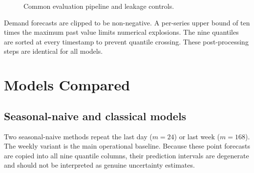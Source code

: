 \documentclass[11pt,a4paper]{article}
\begin{document}
\begin{figure}[htbp]
\centering
{}
\caption{Common evaluation pipeline and leakage controls.}
\label{fig:pipeline}
\end{figure}

Demand forecasts are clipped to be non-negative. A per-series upper bound of ten times the maximum
past value limits numerical explosions. The nine quantiles are sorted at every timestamp to prevent
quantile crossing. These post-processing steps are identical for all models.

\section{Models Compared}

\subsection{Seasonal-naive and classical models}

Two seasonal-naive methods repeat the last day ($m=24$) or last week ($m=168$). The weekly variant
is the main operational baseline. Because these point forecasts are copied into all nine quantile
columns, their prediction intervals are degenerate and should not be interpreted as genuine
uncertainty estimates.
\end{document}
